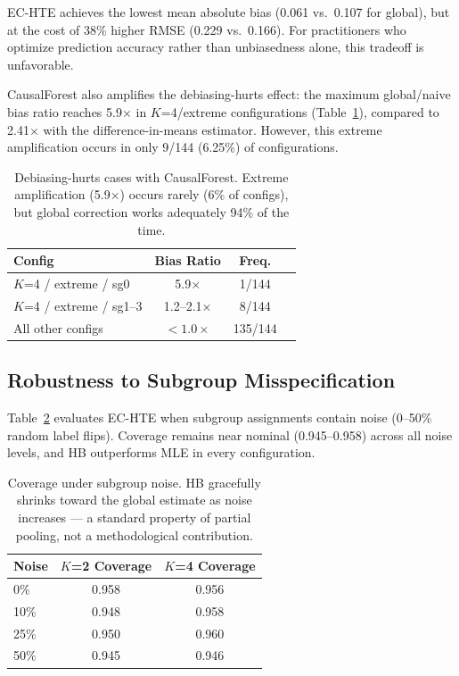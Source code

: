 \documentclass[11pt]{article}
\begin{document}
EC-HTE achieves the lowest mean absolute bias (0.061 vs.\ 0.107 for global), but at the cost of 38\% higher RMSE (0.229 vs.\ 0.166).
For practitioners who optimize prediction accuracy rather than unbiasedness alone, this tradeoff is unfavorable.

CausalForest also amplifies the debiasing-hurts effect: the maximum global/naive bias ratio reaches 5.9$\times$ in $K$=4/extreme configurations (Table~\ref{tab:cf-hurts}), compared to 2.41$\times$ with the difference-in-means estimator.
However, this extreme amplification occurs in only 9/144 (6.25\%) of configurations.

\begin{table}[t]
\centering
\small
\begin{tabular}{lccc}
\toprule
Config & Bias Ratio & Freq. \\
\midrule
$K$=4 / extreme / sg0 & 5.9$\times$ & 1/144 \\
$K$=4 / extreme / sg1--3 & 1.2--2.1$\times$ & 8/144 \\
All other configs & ${<}1.0\times$ & 135/144 \\
\bottomrule
\end{tabular}
\caption{Debiasing-hurts cases with CausalForest. Extreme amplification (5.9$\times$) occurs rarely (6\% of configs), but global correction works adequately 94\% of the time.}
\label{tab:cf-hurts}
\end{table}

\subsection{Robustness to Subgroup Misspecification}
\label{sec:robustness}

Table~\ref{tab:robustness} evaluates EC-HTE when subgroup assignments contain noise (0--50\% random label flips).
Coverage remains near nominal (0.945--0.958) across all noise levels, and HB outperforms MLE in every configuration.

\begin{table}[t]
\centering
\small
\begin{tabular}{lcc}
\toprule
Noise & $K$=2 Coverage & $K$=4 Coverage \\
\midrule
0\% & 0.958 & 0.956 \\
10\% & 0.948 & 0.958 \\
25\% & 0.950 & 0.960 \\
50\% & 0.945 & 0.946 \\
\bottomrule
\end{tabular}
\caption{Coverage under subgroup noise. HB gracefully shrinks toward the global estimate as noise increases --- a standard property of partial pooling, not a methodological contribution.}
\label{tab:robustness}
\end{table}
\end{document}

